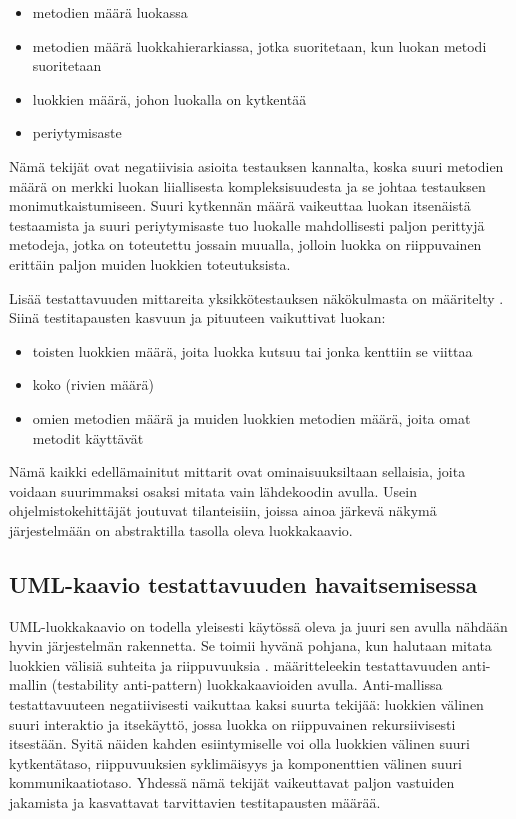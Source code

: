 \documentclass[finnish]{tktltiki2}
\theoremstyle{definition}
\theoremstyle{remark}
\begin{document}
\begin{itemize}
	\item metodien määrä luokassa
	\item metodien määrä luokkahierarkiassa, jotka suoritetaan, kun luokan metodi suoritetaan
	\item luokkien määrä, johon luokalla on kytkentää
	\item periytymisaste
\end{itemize}

\noindent
Nämä tekijät ovat negatiivisia asioita testauksen kannalta, koska suuri metodien määrä on merkki luokan liiallisesta kompleksisuudesta ja se johtaa testauksen monimutkaistumiseen. Suuri kytkennän määrä vaikeuttaa luokan itsenäistä testaamista ja suuri periytymisaste tuo luokalle mahdollisesti paljon perittyjä metodeja, jotka on toteutettu jossain muualla, jolloin luokka on riippuvainen erittäin paljon muiden luokkien toteutuksista. 


Lisää testattavuuden mittareita yksikkötestauksen näkökulmasta on määritelty \citep[s. 9]{Bruntink:2004}. Siinä testitapausten kasvuun ja pituuteen vaikuttivat luokan: 

\begin{itemize}
	\item toisten luokkien määrä, joita luokka kutsuu tai jonka kenttiin se viittaa
	\item koko (rivien määrä)
	\item omien metodien määrä ja muiden luokkien metodien määrä, joita omat metodit käyttävät
\end{itemize} 

Nämä kaikki edellämainitut mittarit ovat ominaisuuksiltaan sellaisia, joita voidaan suurimmaksi osaksi mitata vain lähdekoodin avulla. Usein ohjelmistokehittäjät joutuvat tilanteisiin, joissa ainoa järkevä näkymä järjestelmään on abstraktilla tasolla oleva luokkakaavio.

\subsection{UML-kaavio testattavuuden havaitsemisessa}

UML-luokkakaavio on todella yleisesti käytössä oleva ja juuri sen avulla nähdään hyvin järjestelmän rakennetta. Se toimii hyvänä pohjana, kun halutaan mitata luokkien välisiä suhteita ja riippuvuuksia \citep[s. ]{baudry_testability_2002}. \citep[s. 3]{baudry_measuring_2003} määritteleekin testattavuuden anti-mallin (testability anti-pattern) luokkakaavioiden avulla. Anti-mallissa testattavuuteen negatiivisesti vaikuttaa kaksi suurta tekijää: luokkien välinen suuri interaktio ja itsekäyttö, jossa luokka on riippuvainen rekursiivisesti itsestään. Syitä näiden kahden esiintymiselle voi olla luokkien välinen suuri kytkentätaso, riippuvuuksien syklimäisyys ja komponenttien välinen suuri kommunikaatiotaso. Yhdessä nämä tekijät vaikeuttavat paljon vastuiden jakamista ja kasvattavat tarvittavien testitapausten määrää. 
\end{document}
